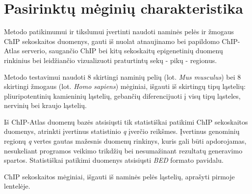 \documentclass[12pt]{article}
\begin{document}
\newpage


\section{Pasirinktų mėginių charakteristika}
Metodo patikimumui ir tikslumui įvertinti naudoti naminės pelės ir žmogaus
ChIP sekoskaitos duomenys, gauti iš nuolat atnaujinamo bei papildomo
ChIP-Atlas\cite{CHIPATLAS} serverio, saugančio ChIP bei kitų sekoskaitų
epigenetinių duomenų rinkinius bei leidžiančio vizualizuoti praturtintų sekų -
pikų - regionus\cite{CHIPATLAS2}.

Metodo testavimui naudoti 8 skirtingi naminių pelių (lot. \emph{Mus musculus})
bei 8 skirtingi žmogaus (lot. \emph{Homo sapiens}) mėginiai, išgauti iš
skirtingų tipų ląstelių: pliuripotentinių kamieninių ląstelių, gebančių
diferencijuoti į visų tipų ląsteles, nervinių bei kraujo ląstelių.

Iš ChIP-Atlas duomenų bazės atsisiųsti tik statistiškai patikimi ChIP
sekoskaitos duomenys, atrinkti įvertinus statistinio \emph{q} įverčio reikšmes.
Įvertinus genominių regionų \emph{q} vertes gautas mažesnis duomenų rinkinys,
kuris gali būti apdorojamas, nesukeliant programos veikimo trikdžių bei
nesumažinant rezultatų generavimo spartos. Statistiškai patikimi duomenys
atsisiųsti \emph{BED} formato pavidalu.

ChIP sekoskaitos mėginiai, išgauti iš naminės pelės ląstelių, aprašyti pirmoje
lentelėje.
\end{document}
